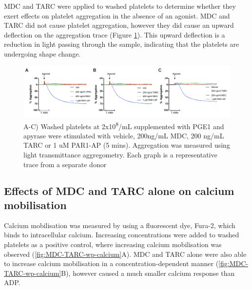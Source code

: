 \documentclass[11pt,twoside]{bristolthesis}
\begin{document}
MDC and TARC were applied to washed platelets to determine whether they exert effects on platelet aggregation in the absence of an agonist. MDC and TARC did not cause platelet aggregation, however they did cause an upward deflection on the aggregation trace (Figure \ref{fig:MDC-TARC-wp-alone-aggregation}). This upward deflection is a reduction in light passing through the sample, indicating that the platelets are undergoing shape change.



\begin{figure}
\includegraphics[width=0.9\linewidth]{figure/Chemokines/Layouts/MDC_TARC_alone_wp_aggregation} \caption[The effect of the chemokines MDC and TARC alone on aggregation in washed platelets]{A-C) Washed platelets at 2x10\textsuperscript{8}/mL supplemented with PGE1 and apyrase were stimulated with vehicle, 200ng/mL MDC, 200 ng/mL TARC or 1 uM PAR1-AP (5 mins). Aggregation was measured using light transmittance aggregometry. Each graph is a representative trace from a separate donor}\label{fig:MDC-TARC-wp-alone-aggregation}
\end{figure}
\hypertarget{effects-of-mdc-and-tarc-alone-on-calcium-mobilisation}{%
\subsection{Effects of MDC and TARC alone on calcium mobilisation}\label{effects-of-mdc-and-tarc-alone-on-calcium-mobilisation}}

Calcium mobilisation was measured by using a fluorescent dye, Fura-2, which binds to intracellular calcium. Increasing concentrations were added to washed platelets as a positive control, where increasing calcium mobilisation was observed (\ref{fig:MDC-TARC-wp-calcium}A). MDC and TARC alone were also able to increase calcium mobilisation in a concentration-dependent manner (\ref{fig:MDC-TARC-wp-calcium}B), however caused a much smaller calcium response than ADP.
\end{document}

